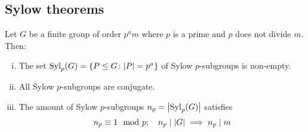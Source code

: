\subsection{Sylow theorems}
\begin{theorem}
	Let \( G \) be a finite group of order \( p^a m \) where \( p \) is a prime and \( p \) does not divide \( m \).
	Then:
	\begin{enumerate}[(i)]
		\item The set \( \mathrm{Syl}_p(G) = \qty{P \leq G \colon \abs{P} = p^a} \) of Sylow \( p \)-subgroups is non-empty.
		\item All Sylow \( p \)-subgroups are conjugate.
		\item The amount of Sylow \( p \)-subgroups \( n_p = \abs{\mathrm{Syl}_p(G)} \) satisfies
			\[ n_p \equiv 1 \mod p;\quad n_p \mid \abs{G} \implies n_p \mid m \]
	\end{enumerate}
\end{theorem}
